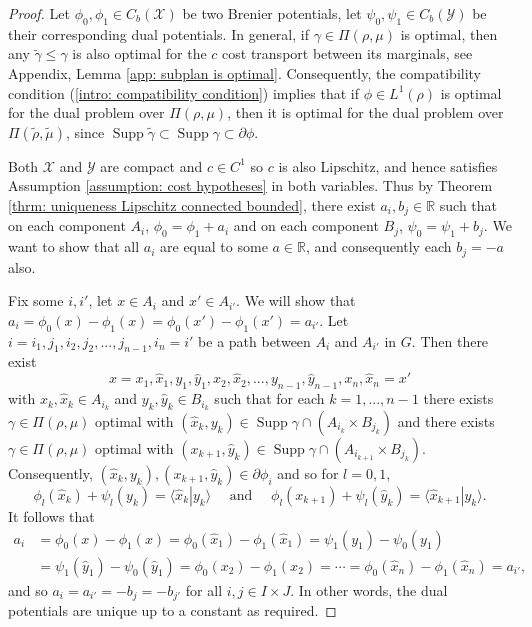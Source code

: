 \documentclass[11pt, oneside, titlepage]{book}
\theoremstyle{plain}
\theoremstyle{definition}
\newcommand{\R}{\mathbb{R}}
\newcommand{\X}{\mathcal{X}}
\newcommand{\Y}{\mathcal{Y}}
\DeclareMathOperator{\supp}{Supp}
\begin{document}
\begin{proof}
Let $\phi_0, \phi_1 \in C_b(\X)$ be two Brenier potentials, let $\psi_0, \psi_1 \in C_b(\Y)$ be their corresponding dual potentials. In general, if $\gamma \in \Pi(\rho, \mu)$ is optimal, then any $\tilde\gamma \leq \gamma$ is also optimal for the $c$ cost transport between its marginals, see Appendix, Lemma \ref{app: subplan is optimal}. Consequently, the compatibility condition (\ref{intro: compatibility condition}) implies that if $\phi \in L^1(\rho)$ is optimal for the dual problem over $\Pi(\rho, \mu)$, then it is optimal for the dual problem over $\Pi(\tilde\rho, \tilde\mu)$, since $\supp \tilde \gamma \subset \supp \gamma \subset \partial \phi$. 

Both $\X$ and $\Y$ are compact and $c\in C^1$ so $c$ is also Lipschitz, and hence satisfies Assumption \ref{assumption: cost hypotheses} in both variables. Thus by Theorem \ref{thrm: uniqueness Lipschitz connected bounded}, there exist $a_i, b_j \in \R$ such that on each component $A_i$, $\phi_0 = \phi_1 + a_i$ and on each component $B_j$, $\psi_0 = \psi_1 + b_j$. We want to show that all $a_i$ are equal to some $a \in \R$, and consequently each $b_j = -a$ also. 

Fix some $i, i'$, let $x \in A_i$ and $x' \in A_{i'}$. We will show that $a_i = \phi_0(x) - \phi_1(x) = \phi_0(x') - \phi_1(x') = a_{i'}$. Let $i=i_1, j_1, i_2, j_2,..., j_{n-1}, i_n = i'$ be a path between $A_i$ and $A_{i'}$ in $G$. Then there exist
\begin{equation*}
    x=x_{1}, \hat x_{1}, y_{1}, \hat y_{1}, x_{2}, \hat x_{2},..., y_{{n-1}}, \hat y_{{n-1}}, x_{n}, \hat x_{n} = x'
\end{equation*}
with $x_{k}, \hat x_{k} \in A_{i_k}$ and $y_{k}, \hat y_{k} \in B_{i_k}$ such that for each $k=1,...,n-1$ there exists $\gamma \in \Pi(\rho, \mu)$ optimal with $(\hat x_{k}, y_{k}) \in \supp \gamma \cap (A_{i_k} \times B_{j_k})$ and there exists $\gamma \in \Pi(\rho, \mu)$ optimal with $(x_{{k+1}}, \hat y_{k}) \in \supp \gamma \cap (A_{i_{k+1}} \times B_{j_k})$. Consequently, $(\hat x_{k}, y_{k}), (x_{{k+1}}, \hat y_{k}) \in \partial \phi_i$ and so for $l = 0, 1$,
\begin{equation}
    \phi_l(\hat x_{k}) + \psi_l(y_k) = \langle\hat{x}_k | y_k \rangle \quad \text{ and }\quad \phi_l(x_{k+1}) + \psi_l(\hat y_k) = \langle \hat{x}_{k+1} | y_k \rangle.
\end{equation}
It follows that
\begin{align*}
    a_i &= \phi_0(x) - \phi_1(x) = \phi_0(\hat x_1) - \phi_1(\hat x_1) = \psi_1(y_1) - \psi_0(y_1)\\ &= \psi_1(\hat y_1) - \psi_0( \hat y_1) = \phi_0(x_2) - \phi_1( x_2) = \cdots = \phi_0(\hat x_n) - \phi_1(\hat x_n) = a_{i'},
\end{align*}
and so $a_i = a_{i'} = -b_{j} = -b_{j'}$ for all $i, j \in I \times J$. In other words, the dual potentials are unique up to a constant as required.
\end{proof}
\end{document}

